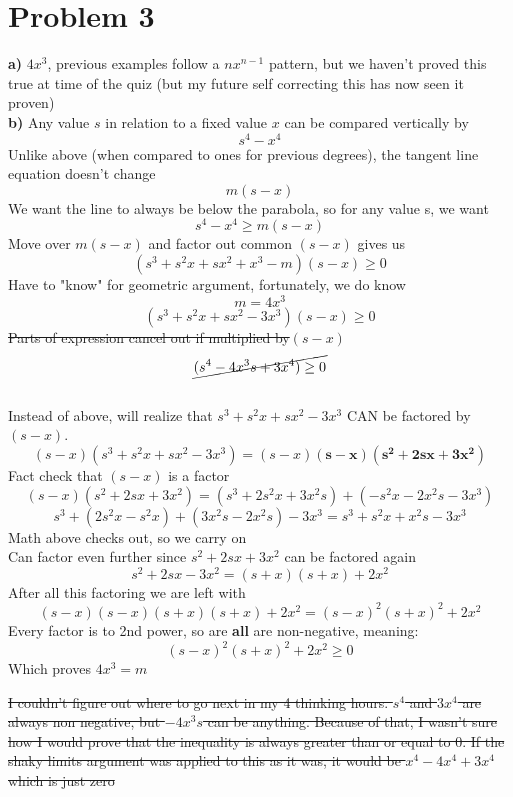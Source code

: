 \documentclass{article}
\begin{document}
\section{Problem 3}
\textbf{a)}
$4x^3$, previous examples follow a $nx^{n-1}$ pattern, but we haven't proved this true at time of the quiz (but my future self correcting this has now seen it proven)
\\
\textbf{b)}
Any value $s$ in relation to a fixed value $x$ can be compared vertically by
$$ s^4-x^4 $$
Unlike above (when compared to ones for previous degrees), the tangent line equation doesn't change
$$ m(s-x) $$
We want the line to always be below the parabola, so for any value s, we want
$$ s^4 - x^4 \geq m(s-x) $$
Move over $m(s-x)$ and factor out common $(s-x)$ gives us
$$ (s^3+s^2x+sx^2+x^3-m)(s-x)\geq 0 $$
Have to "know" for geometric argument, fortunately, we do know
$$ m=4x^3 $$
$$ (s^3+s^2x+sx^2-3x^3)(s-x)\geq 0 $$
\sout{Parts of expression cancel out if multiplied by$(s-x)$}
\\
$$\cancel{{(s^4-4x^3s+3x^4)\geq 0}}$$
\\
Instead of above, will realize that $s^3+s^2x+sx^2-3x^3$ CAN be factored by $(s-x)$.
$$ (s-x)(s^3+s^2x+sx^2-3x^3)=(s-x)\mathbf{(s-x)(s^2+2sx+3x^2)}$$
Fact check that $(s-x)$ is a factor
$$ (s-x)(s^2+2sx+3x^2)= (s^3+2s^2x+3x^2s) + (-s^2x-2x^2s-3x^3)$$
$$ s^3+(2s^2x-s^2x)+(3x^2s-2x^2s)-3x^3=s^3+s^2x+x^2s-3x^3$$
Math above checks out, so we carry on
\\
Can factor even further since $s^2+2sx+3x^2$ can be factored again
$$ s^2+2sx-3x^2=(s+x)(s+x)+2x^2$$
After all this factoring we are left with
$$ (s-x)(s-x)(s+x)(s+x)+2x^2=(s-x)^2(s+x)^2+2x^2 $$
Every factor is to 2nd power, so are \textbf{all} are non-negative, meaning:
$$(s-x)^2(s+x)^2+2x^2 \geq 0$$
Which proves $4x^3=m$

\sout{I couldn't figure out where to go next in my 4 thinking hours. $s^4$ and $3x^4$ are always non negative, but $-4x^3s$ can be anything. Because of that, I wasn't sure how I would prove that the inequality is always greater than or equal to 0.  If the shaky limits argument was applied to this as it was, it would be $x^4-4x^4+3x^4$ which is just zero}
\end{document}
